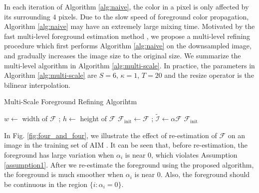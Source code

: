 \documentclass{article}
\theoremstyle{plain}
\begin{document}
In each iteration of Algorithm \ref{alg:naive}, the color in a pixel is only affected by its surrounding $4$ pixels.
Due to the slow speed of foreground color propagation,
Algorithm \ref{alg:naive} may 
have an extremely large mixing time.
Motivated by the fast multi-level foreground estimation method \cite{Germer2020FastMulti-Level},
we propose a multi-level refining procedure which first performs Algorithm \ref{alg:naive} on the downsampled image,
and gradually increases the image size to the original size.
We summarize the multi-level algorithm in Algorithm \ref{alg:multi-scale}.
In practice, the parameters in Algorithm \ref{alg:multi-scale} are $S= 6$, $\kappa = 1$, $T = 20$ and the resize operator is the bilinear interpolation.
\begin{algorithm}[t]
\DontPrintSemicolon
    \SetAlgoNoLine
    \caption{Multi-Scale Foreground Refining Algorihtm}
    \label{alg:multi-scale}
    $w \leftarrow$ width of $\mathcal F$
    ;
    $h \leftarrow$ height of $\mathcal F$
    \;
    $\mathcal F_{\mathrm{init}} \leftarrow \mathcal F$ 
    ;
    $\tilde {\mathcal I} \leftarrow \alpha \mathcal F$ 
    \;
\Return $\mathcal F_{\mathrm{init}}$\;
\end{algorithm}





In Fig. \ref{fig:four_and_four}, we illustrate the effect of re-estimation of $\mathcal F$ on an image in the training set of AIM \cite{Xu2017DeepImageMatting}.
It can be seen that, before re-estimation, the foreground has large variation when $\alpha_i$ is near $0$, which violates Assumption \ref{assumption1}.
After we re-estimate the foreground using the proposed algorithm, 
the foreground is much smoother when $\alpha_i$ is near $0$.
Also, the foreground should be continuous in the region $\{i: \alpha_i = 0\}$.
 
\end{document}
